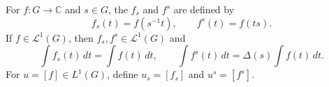 \begin{definition}
For $f: G \to \mathbb{C}$ and $s \in G$, the  $f_s$ and  $f^s$ are defined by
$$f_s(t) = f(s^{-1}t), \qquad f^s(t) = f(ts).$$
If $f \in \mathcal{L}^1(G)$, then $f_s, f^s \in \mathcal{L}^1(G)$ and
$$\int f_s(t)\, dt = \int f(t)\, dt, \qquad \int f^s(t)\, dt = \Delta(s) \int f(t)\, dt.$$
For $u = [f] \in L^1(G)$, define $u_s = [f_s]$ and $u^s = [f^s]$.
\end{definition}
